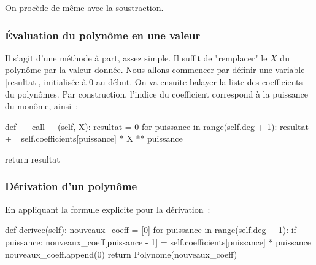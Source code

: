 		On procède de même avec la soustraction.
		
		\subsubsection{Évaluation du polynôme en une valeur}
		Il s'agit d'une méthode à part, assez simple. Il suffit de "remplacer" le $X$ du polynôme par la valeur donnée. Nous allons commencer par définir une variable \python|resultat|, initialisée à $0$ au début. On va ensuite balayer la liste des coefficients du polynômes. Par construction, l'indice du coefficient correspond à la puissance du monôme, ainsi~:
		\begin{pythoncode}
			def __call__(self, X):
				resultat = 0
				for puissance in range(self.deg + 1):
				    resultat += self.coefficients[puissance] * X ** puissance

				return resultat
		\end{pythoncode}
		
		\subsubsection{Dérivation d'un polynôme}
			En appliquant la formule explicite pour la dérivation~:
			\begin{pythoncode}
				def derivee(self):
					nouveaux_coeff = [0]
					for puissance in range(self.deg + 1):
						if puissance:
						    nouveaux_coeff[puissance - 1] = self.coefficients[puissance] * puissance
						    nouveaux_coeff.append(0)
					return Polynome(nouveaux_coeff)
			\end{pythoncode}
		
